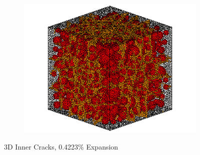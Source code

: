   \begin{figure}[ht]
  \centering
      \begin{subfigure}{.5\textwidth}
        \centering
        \includegraphics[width=.8\linewidth]{Files/exp_3D/DEF/A30X0C_3_c.png}
      \end{subfigure}%
    \label{fig:DEF_A30X0C_3_crack}
    \caption{3D Inner Cracks, 0.4223\% Expansion}
  \end{figure}


